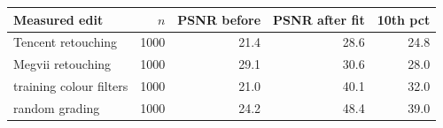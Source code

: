 \begin{tabular}{@{}lrrrr@{}}
\toprule
Measured edit & $n$ & PSNR before & PSNR after fit & 10th pct \\
\midrule
Tencent retouching & 1000 & 21.4 & 28.6 & 24.8 \\
Megvii retouching & 1000 & 29.1 & 30.6 & 28.0 \\
training colour filters & 1000 & 21.0 & 40.1 & 32.0 \\
random grading & 1000 & 24.2 & 48.4 & 39.0 \\
\bottomrule
\end{tabular}
